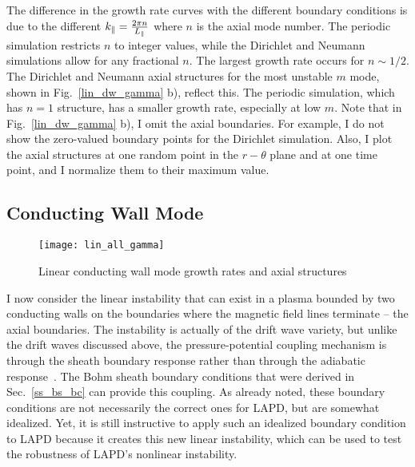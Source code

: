 The difference in the growth rate curves with the different boundary conditions is due to the different $k_\parallel = \frac{2 \pi n}{L_\parallel}$ where $n$ is the axial mode number. The periodic simulation
restricts $n$ to integer values, while the Dirichlet and Neumann simulations allow for any fractional $n$. The largest growth rate occurs for $n \sim 1/2$. The Dirichlet and Neumann axial structures
for the most unstable $m$ mode, shown in Fig.~\ref{lin_dw_gamma} b), reflect this. The periodic simulation, which has $n=1$ structure, has a smaller growth rate, especially at low $m$. Note that in
Fig.~\ref{lin_dw_gamma} b), I omit the axial boundaries. For example, I do not show the zero-valued boundary points for the Dirichlet simulation. Also, I plot the axial structures at one
random point in the $r-\theta$ plane and at one time point, and I normalize them to their maximum value.

\subsection{Conducting Wall Mode}
\label{ss_cwm}

\begin{figure}
\centerline{\texttt{[image: lin\_all\_gamma]}}
\caption{Linear conducting wall mode growth rates and axial structures}
\label{lin_all_gamma}
\end{figure}


I now consider the linear instability that can exist in a plasma bounded by two conducting walls on the boundaries where the magnetic field lines terminate -- the axial boundaries.
The instability is actually of the drift wave variety, but unlike the drift waves discussed above, the pressure-potential coupling mechanism is through the sheath boundary response
rather than through the adiabatic response~\cite{berk1991,berk1993,xu1993}. The Bohm sheath boundary conditions that were derived in Sec.~\ref{ss_bs_bc} can provide this coupling. 
As already noted, these boundary conditions are not necessarily the correct ones
for LAPD, but are somewhat idealized. Yet, it is still instructive to apply such an idealized boundary condition to LAPD because it creates this new linear instability, which
can be used to test the robustness of LAPD's nonlinear instability.

